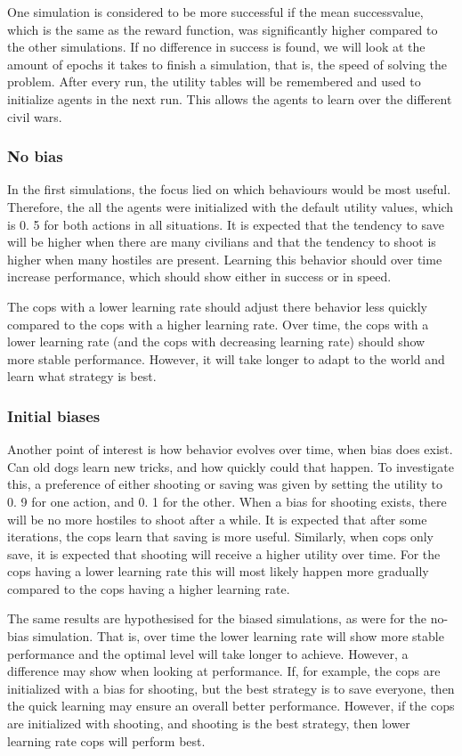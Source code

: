 One simulation is considered to be more successful if the mean successvalue, which is the same as the reward function, was significantly higher compared to the other simulations.
If no difference in success is found, we will look at the amount of epochs it takes to finish a simulation, that is, the speed of solving the problem.
After every run, the utility tables will be remembered and used to initialize agents in the next run.
This allows the agents to learn over the different civil wars.


\subsubsection{No bias}
In the first simulations, the focus lied on which behaviours would be most useful.
Therefore, the all the agents were initialized with the default utility values, which is 0.
5 for both actions in all situations.
It is expected that the tendency to save will be higher when there are many civilians and that the tendency to shoot is higher when many hostiles are present.
Learning this behavior should over time increase performance, which should show either in success or in speed.


The cops with a lower learning rate should adjust there behavior less quickly compared to the cops with a higher learning rate.
Over time, the cops with a lower learning rate (and the cops with decreasing learning rate) should show more stable performance.
However, it will take longer to adapt to the world and learn what strategy is best.

\subsubsection{Initial biases}
Another point of interest is how behavior evolves over time, when bias does exist.
Can old dogs learn new tricks, and how quickly could that happen.
To investigate this, a preference of either shooting or saving was given by setting the utility to 0.
9 for one action, and 0.
1 for the other.
When a bias for shooting exists, there will be no more hostiles to shoot after a while.
It is expected that after some iterations, the cops learn that saving is more useful.
Similarly, when cops only save, it is expected that shooting will receive a higher utility over time.
For the cops having a lower learning rate this will most likely happen more gradually compared to the cops having a higher learning rate.


The same results are hypothesised for the biased simulations, as were for the no-bias simulation.
That is, over time the lower learning rate will show more stable performance and the optimal level will take longer to achieve.
However, a difference may show when looking at performance.
If, for example, the cops are initialized with a bias for shooting, but the best strategy is to save everyone, then the quick learning may ensure an overall better performance.
However, if the cops are initialized with shooting, and shooting is the best strategy, then lower learning rate cops will perform best.

